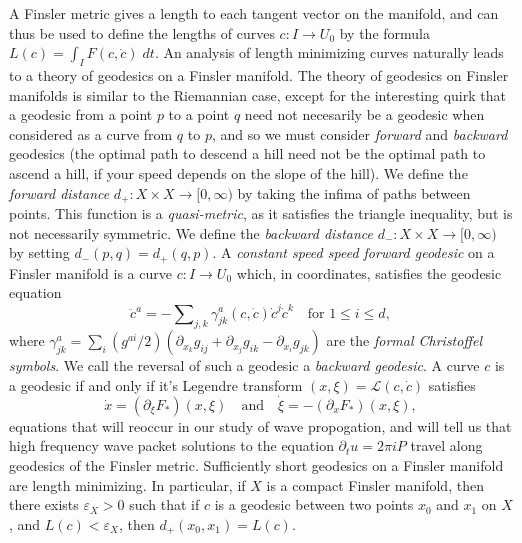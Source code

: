 A Finsler metric gives a length to each tangent vector on the manifold, and can thus be used to define the lengths of curves $c: I \to U_0$ by the formula $L(c) = \int_I F(c,\dot{c})\; dt$. An analysis of length minimizing curves naturally leads to a theory of geodesics on a Finsler manifold. The theory of geodesics on Finsler manifolds is similar to the Riemannian case, except for the interesting quirk that a geodesic from a point $p$ to a point $q$ need not necesarily be a geodesic when considered as a curve from $q$ to $p$, and so we must consider \emph{forward} and \emph{backward} geodesics (the optimal path to descend a hill need not be the optimal path to ascend a hill, if your speed depends on the slope of the hill). We define the \emph{forward distance} $d_+: X \times X \to [0,\infty)$ by taking the infima of paths between points. This function is a \emph{quasi-metric}, as it satisfies the triangle inequality, but is not necessarily symmetric. We define the \emph{backward distance} $d_-: X \times X \to [0,\infty)$ by setting $d_-(p,q) = d_+(q,p)$. A \emph{constant speed speed forward geodesic} on a Finsler manifold is a curve $c: I \to U_0$ which, in coordinates, satisfies the geodesic equation
%
%
\begin{equation} \label{geodesicequation}
    \ddot{c}^a = - \sum\nolimits_{j,k} \gamma^a_{jk}(c,\dot{c}) \dot{c}^j \dot{c}^k \quad\text{for $1 \leq i \leq d$},
\end{equation}
%
where $\gamma^a_{jk} = \sum_i (g^{ai}/2) ( \partial_{x_k} g_{ij} + \partial_{x_j} g_{ik} - \partial_{x_i} g_{jk} )$ are the \emph{formal Christoffel symbols}. %
%
%
We call the reversal of such a geodesic a \emph{backward geodesic}. A curve $c$ is a geodesic if and only if it's Legendre transform $(x,\xi) = \mathcal{L}(c,\dot{c})$ satisfies
%
\begin{equation} \label{FStarHamilton}
    \dot{x} = (\partial_\xi F_*)(x,\xi) \quad\text{and}\quad \dot{\xi} = - (\partial_x F_*)(x,\xi),
\end{equation}
%
equations that will reoccur in our study of wave propogation, and will tell us that high frequency wave packet solutions to the equation $\partial_t u = 2 \pi i P$ travel along geodesics of the Finsler metric. Sufficiently short geodesics on a Finsler manifold are length minimizing. In particular, if $X$ is a compact Finsler manifold, then there exists $\varepsilon_X > 0$ such that if $c$ is a geodesic between two points $x_0$ and $x_1$ on $X$, and $L(c) < \varepsilon_X$, then $d_+(x_0,x_1) = L(c)$.


